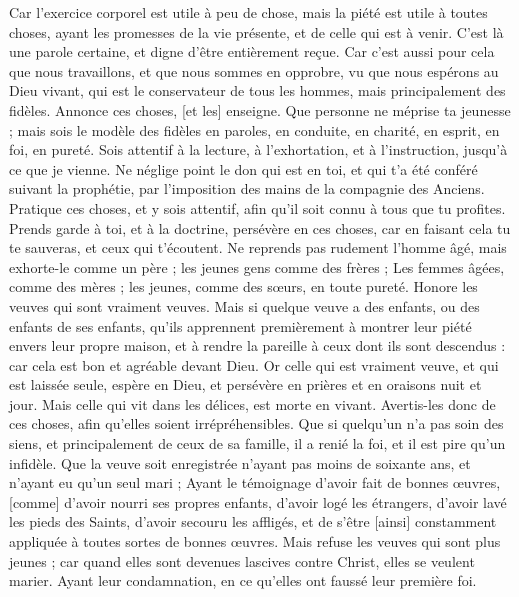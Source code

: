 \begin{multicols}{2}
Car l'exercice corporel est utile à peu de chose, mais la piété est utile à toutes choses, ayant les promesses de la vie présente, et de celle qui est à venir.
C'est là une parole certaine, et digne d'être entièrement reçue.
Car c'est aussi pour cela que nous travaillons, et que nous sommes en opprobre, vu que nous espérons au Dieu vivant, qui est le conservateur de tous les hommes, mais principalement des fidèles.
Annonce ces choses, [et les] enseigne.
Que personne ne méprise ta jeunesse ; mais sois le modèle des fidèles en paroles, en conduite, en charité, en esprit, en foi, en pureté.
Sois attentif à la lecture, à l'exhortation, et à l'instruction, jusqu'à ce que je vienne.
Ne néglige point le don qui est en toi, et qui t'a été conféré suivant la prophétie, par l'imposition des mains de la compagnie des Anciens.
Pratique ces choses, et y sois attentif, afin qu'il soit connu à tous que tu profites.
Prends garde à toi, et à la doctrine, persévère en ces choses, car en faisant cela tu te sauveras, et ceux qui t'écoutent.
\VerseOne{}Ne reprends pas rudement l'homme âgé, mais exhorte-le comme un père ; les jeunes gens comme des frères ;
Les femmes âgées, comme des mères ; les jeunes, comme des sœurs, en toute pureté.
Honore les veuves qui sont vraiment veuves.
Mais si quelque veuve a des enfants, ou des enfants de ses enfants, qu'ils apprennent premièrement à montrer leur piété envers leur propre maison, et à rendre la pareille à ceux dont ils sont descendus : car cela est bon et agréable devant Dieu.
Or celle qui est vraiment veuve, et qui est laissée seule, espère en Dieu, et persévère en prières et en oraisons nuit et jour.
Mais celle qui vit dans les délices, est morte en vivant.
Avertis-les donc de ces choses, afin qu'elles soient irrépréhensibles.
Que si quelqu'un n'a pas soin des siens, et principalement de ceux de sa famille, il a renié la foi, et il est pire qu'un infidèle.
Que la veuve soit enregistrée n'ayant pas moins de soixante ans, et n'ayant eu qu'un seul mari ;
Ayant le témoignage d'avoir fait de bonnes œuvres, [comme] d'avoir nourri ses propres enfants, d'avoir logé les étrangers, d'avoir lavé les pieds des Saints, d'avoir secouru les affligés, et de s'être [ainsi] constamment appliquée à toutes sortes de bonnes œuvres.
Mais refuse les veuves qui sont plus jeunes ; car quand elles sont devenues lascives contre Christ, elles se veulent marier.
Ayant leur condamnation, en ce qu'elles ont faussé leur première foi.

\end{multicols}
